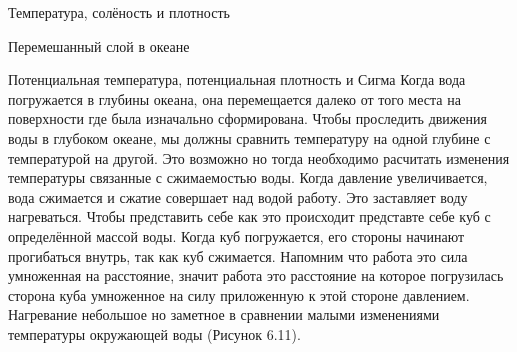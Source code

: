 \begin{chapter}{Температура, солёность и плотность}
\begin{section}{Перемешанный слой в океане}

\end{section}

\begin{section}{Потенциальная температура, потенциальная плотность и Сигма}
Когда вода погружается в глубины океана, она перемещается далеко от
того места на поверхности где была изначально сформирована. Чтобы
проследить движения воды в глубоком океане, мы должны сравнить
температуру на одной глубине с температурой на другой. Это возможно но
тогда необходимо расчитать изменения температуры связанные с
сжимаемостью воды. Когда давление увеличивается, вода сжимается и
сжатие совершает над водой работу. Это заставляет воду
нагреваться. Чтобы представить себе как это происходит представте себе
куб с определённой массой воды. Когда куб погружается, его стороны
начинают прогибаться внутрь, так как куб сжимается. Напомним что
работа это сила умноженная на расстояние, значит работа это расстояние
на которое погрузилась сторона куба умноженное на силу приложенную к
этой стороне давлением. Нагревание небольшое но заметное в сравнении
малыми изменениями температуры окружающей воды (Рисунок 6.11).
%


\end{section}
\end{chapter}
